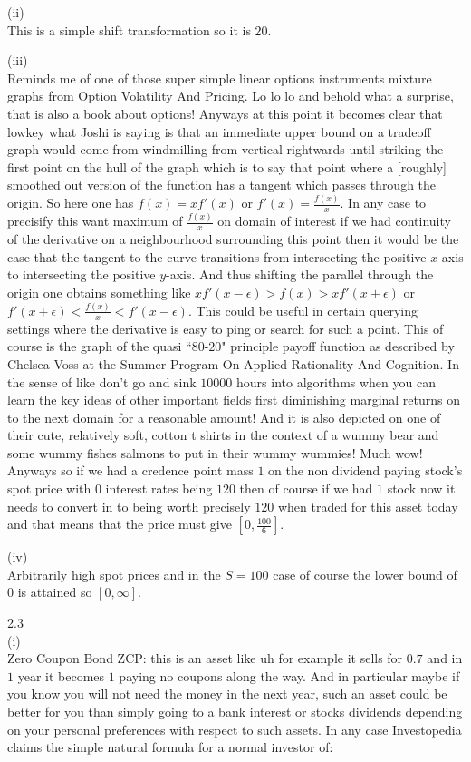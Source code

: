(ii) \\
This is a simple shift transformation so it is $\boxed{20}$.

(iii) \\
Reminds me of one of those super simple linear options instruments mixture graphs from Option Volatility And Pricing. Lo lo lo and behold what a surprise, that is also a book about options! Anyways at this point it becomes clear that lowkey what Joshi is saying is that an immediate upper bound on a tradeoff graph would come from windmilling from vertical rightwards until striking the first point on the hull of the graph which is to say that point where a [roughly] smoothed out version of the function has a tangent which passes through the origin. So here one has $f(x)=xf'(x)$ or $f'(x)=\frac{f(x)}{x}$. In any case to precisify this want maximum of $\frac{f(x)}{x}$ on domain of interest if we had continuity of the derivative on a neighbourhood surrounding this point then it would be the case that the tangent to the curve transitions from intersecting the positive $x$-axis to intersecting the positive $y$-axis. And thus shifting the parallel through the origin one obtains something like $xf'(x-\epsilon)>f(x)>xf'(x+\epsilon)$ or $f'(x+\epsilon) < \frac{f(x)}{x} < f'(x-\epsilon)$. This could be useful in certain querying settings where the derivative is easy to ping or search for such a point. This of course is the graph of the quasi ``$80$-$20$" principle payoff function as described by Chelsea Voss at the Summer Program On Applied Rationality And Cognition. In the sense of like don't go and sink $10000$ hours into algorithms when you can learn the key ideas of other important fields first diminishing marginal returns on to the next domain for a reasonable amount! And it is also depicted on one of their cute, relatively soft, cotton t shirts in the context of a wummy bear and some wummy fishes salmons to put in their wummy wummies! Much wow! Anyways so if we had a credence point mass $1$ on the non dividend paying stock's spot price with $0$ interest rates being $120$ then of course if we had $1$ stock now it needs to convert in to being worth precisely $120$ when traded for this asset today and that means that the price must give $\boxed{\left [ 0,\frac{100}{6} \right ]}$.

(iv) \\
Arbitrarily high spot prices and in the $S=100$ case of course the lower bound of $0$ is attained so $\boxed{[0,\infty]}$.

2.3 \\
(i) \\
Zero Coupon Bond ZCP: this is an asset like uh for example it sells for $0.7$ and in $1$ year it becomes $1$ paying no coupons along the way. And in particular maybe if you know you will not need the money in the next year, such an asset could be better for you than simply going to a bank interest or stocks dividends depending on your personal preferences with respect to such assets. In any case Investopedia claims the simple natural formula for a normal investor of:

